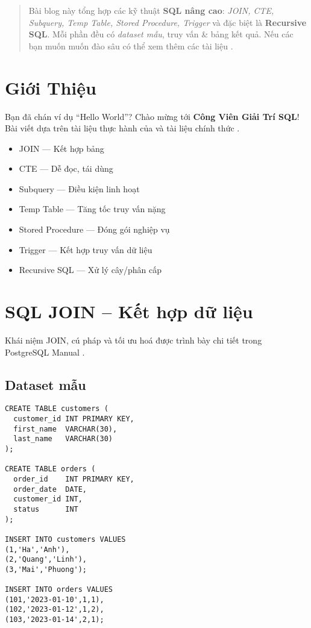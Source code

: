 \begin{abstract}
Bài blog này tổng hợp các kỹ thuật \textbf{SQL nâng cao}: \textit{JOIN, CTE, Subquery, Temp Table, Stored Procedure, Trigger} và đặc biệt là \textbf{Recursive SQL}.  
Mỗi phần đều có \textit{dataset mẫu}, truy vấn \& bảng kết quả.  
Nếu các bạn muốn muốn đào sâu có thể xem thêm các tài liệu \cite{postgresql_docs,mysql_manual,beaulieu2020}.
\end{abstract}

\tableofcontents
\newpage

\section{Giới Thiệu}
Bạn đã chán ví dụ “Hello World”? Chào mừng tới \textbf{Công Viên Giải Trí SQL}!  
Bài viết dựa trên tài liệu thực hành của \cite{beaulieu2020,celko2015} và tài liệu chính thức \cite{postgresql_docs,mysql_manual}.

\begin{itemize}
  \item JOIN — Kết hợp bảng
  \item CTE — Dễ đọc, tái dùng
  \item Subquery — Điều kiện linh hoạt
  \item Temp Table — Tăng tốc truy vấn nặng
  \item Stored Procedure — Đóng gói nghiệp vụ
  \item Trigger — Kết hợp truy vấn dữ liệu
  \item Recursive SQL — Xử lý cây/phân cấp
\end{itemize}

\section{SQL JOIN – Kết hợp dữ liệu}

Khái niệm JOIN, cú pháp và tối ưu hoá được trình bày chi tiết trong PostgreSQL Manual \cite{postgresql_docs}.

\subsection{Dataset mẫu}

\begin{lstlisting}[caption={Tạo bảng customers và orders để thực hành JOIN}]
CREATE TABLE customers (
  customer_id INT PRIMARY KEY,
  first_name  VARCHAR(30),
  last_name   VARCHAR(30)
);

CREATE TABLE orders (
  order_id    INT PRIMARY KEY,
  order_date  DATE,
  customer_id INT,
  status      INT
);

INSERT INTO customers VALUES
(1,'Ha','Anh'),
(2,'Quang','Linh'),
(3,'Mai','Phuong');

INSERT INTO orders VALUES
(101,'2023-01-10',1,1),
(102,'2023-01-12',1,2),
(103,'2023-01-14',2,1);
\end{lstlisting}

